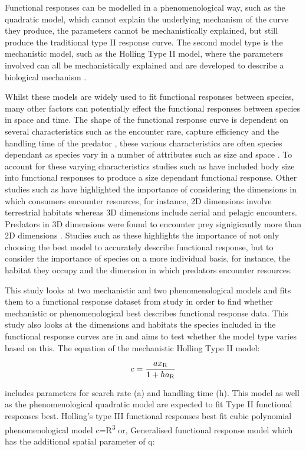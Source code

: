 \documentclass[11pt]{article}
\begin{document}
Functional responses can be modelled in a phenomenological way, such as the quadratic model, which cannot explain the underlying mechanism of the curve they produce, the parameters cannot be mechanistically explained, but still produce the traditional type II response curve. The second model type is the mechanistic model, such as the Holling Type II model,  \cite{Holling1959} where the parameters involved can all be mechanistically explained and are developed to describe a biological mechanism \cite{Jeschke2002}.

Whilst these models are widely used to fit functional responses between species, many other factors can potentially effect the functional responses between species in space and time. The shape of the functional response curve is dependent on several characteristics such as the encounter rare, capture efficiency and the handling time of the predator \cite{Holling1965}, these various characteristics are often species dependant as species vary in a number of attributes such as size and space \cite{Elliott2003}. To account for these varying characteristics studies such as \cite{Aljetlawi2004}  have included body size into functional responses to produce a size dependant functional response. Other studies such as \cite{Pawar2012} have highlighted the importance of considering the dimensions in which consumers encounter resources, for instance, 2D dimensions involve terrestrial habitats whereas 3D dimensions include aerial and pelagic encounters. Predators in 3D dimensions were found to encounter prey signigicantly more than 2D dimensions \cite{Pawar2012}. Studies such as these highlights the importance of not only choosing the best model to accurately describe functional response, but to consider the importance of species on a more individual basis, for instance, the habitat they occupy and the dimension in which predators encounter resources. 

This study looks at two mechanistic and two phenomenological models and fits them to a functional response dataset from \cite{Pawar2012} study in order to find whether mechanistic or phenomenological best describes functional response data. This study also looks at the dimensions and habitats the species included in the functional response curves are in and aims to test whether the model type varies based on this. The equation of the mechanistic Holling Type II model: 

$$c=\frac{ax\textsubscript{R}}{1+ha\textsubscript{R}}$$

includes parameters for search rate (a) and handling time (h). This model as well as the phenomenological quadratic model are expected to fit Type II functional responses best. Holling's type III functional responses best fit cubic polynomial phenomenological model c=R\textsuperscript{3} or, Generalised functional response model which has the additional spatial parameter of q:
\end{document}
